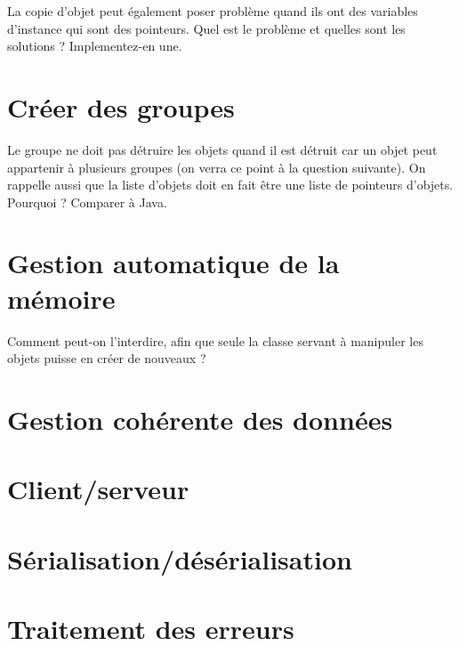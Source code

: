 \documentclass[a4paper]{article}
\begin{document}
La copie d'objet peut également poser problème quand ils ont des variables
d'instance qui sont des pointeurs. Quel est le problème et quelles sont les
solutions ? Implementez-en une. 

\section{Créer des groupes}
Le groupe ne doit pas détruire les objets quand il est détruit car un objet
peut appartenir à plusieurs groupes (on verra ce point à la question suivante).
On rappelle aussi que la liste d'objets doit en fait être une liste de pointeurs
d'objets. Pourquoi ? Comparer à Java. 


\section{Gestion automatique de la mémoire}
Comment peut-on l'interdire, afin que seule la classe servant à manipuler les
objets puisse en créer de nouveaux ? 
\section{Gestion cohérente des données}
\section{Client/serveur}
\section{Sérialisation/désérialisation}
\section{Traitement des erreurs}






    



\end{document}
